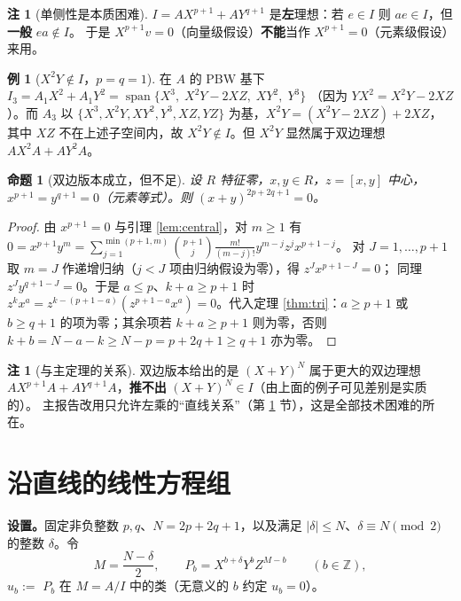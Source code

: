\documentclass[11pt,UTF8]{ctexart}
\newtheorem{proposition}[theorem]{命题}
\theoremstyle{definition}
\newtheorem{remark}[theorem]{注}
\newtheorem{example}[theorem]{例}
\newcommand{\Z}{\mathbb{Z}}
\begin{document}
\begin{remark}[单侧性是本质困难]
$I=AX^{p+1}+AY^{q+1}$ 是\textbf{左}理想：若 $e\in I$ 则 $ae\in I$，但\textbf{一般} $ea\notin I$。
于是 $X^{p+1}v=0$（向量级假设）\textbf{不能}当作 $X^{p+1}=0$（元素级假设）来用。
\end{remark}

\begin{example}[$X^{2}Y\notin I$，$p=q=1$]
在 $A$ 的 PBW 基下
$I_3=A_1X^{2}+A_1Y^{2}=\operatorname{span}\{X^{3},\;X^{2}Y-2XZ,\;XY^{2},\;Y^{3}\}$
（因为 $YX^{2}=X^{2}Y-2XZ$）。而 $A_3$ 以
$\{X^{3},X^{2}Y,XY^{2},Y^{3},XZ,YZ\}$ 为基，$X^{2}Y=(X^{2}Y-2XZ)+2XZ$，
其中 $XZ$ 不在上述子空间内，故 $X^{2}Y\notin I$。但 $X^{2}Y$ 显然属于双边理想
$AX^{2}A+AY^{2}A$。
\end{example}

\begin{proposition}[双边版本成立，但不足]
设 $R$ 特征零，$x,y\in R$，$z=[x,y]$ 中心，$x^{p+1}=y^{q+1}=0$（元素等式）。则
$(x+y)^{2p+2q+1}=0$。
\end{proposition}

\begin{proof}
由 $x^{p+1}=0$ 与引理 \ref{lem:central}，对 $m\ge1$ 有
$0=x^{p+1}y^{m}=\sum_{j=1}^{\min(p+1,m)}\binom{p+1}{j}\frac{m!}{(m-j)!}y^{m-j}z^{j}x^{p+1-j}$。
对 $J=1,\dots,p+1$ 取 $m=J$ 作递增归纳（$j<J$ 项由归纳假设为零），得 $z^{J}x^{p+1-J}=0$；
同理 $z^{J}y^{q+1-J}=0$。于是 $a\le p$、$k+a\ge p+1$ 时
$z^{k}x^{a}=z^{k-(p+1-a)}(z^{p+1-a}x^{a})=0$。代入定理 \ref{thm:tri}：$a\ge p+1$ 或 $b\ge q+1$
的项为零；其余项若 $k+a\ge p+1$ 则为零，否则 $k+b=N-a-k\ge N-p=p+2q+1\ge q+1$ 亦为零。
\end{proof}

\begin{remark}[与主定理的关系]
双边版本给出的是 $(X+Y)^{N}$ 属于更大的双边理想
$AX^{p+1}A+AY^{q+1}A$，\textbf{推不出} $(X+Y)^{N}\in I$（由上面的例子可见差别是实质的）。
主报告改用只允许左乘的“直线关系”（第 \ref{sec:line} 节），这是全部技术困难的所在。
\end{remark}

\section{沿直线的线性方程组}\label{sec:line}

\noindent\textbf{设置。}固定非负整数 $p,q$、$N=2p+2q+1$，以及满足
$|\delta|\le N$、$\delta\equiv N\pmod2$ 的整数 $\delta$。令
\[
M=\frac{N-\delta}{2},\qquad P_b=X^{b+\delta}Y^{b}Z^{M-b}\qquad(b\in\Z),
\]
$u_b:=$ $P_b$ 在 $M=A/I$ 中的类（无意义的 $b$ 约定 $u_b=0$）。
\end{document}

